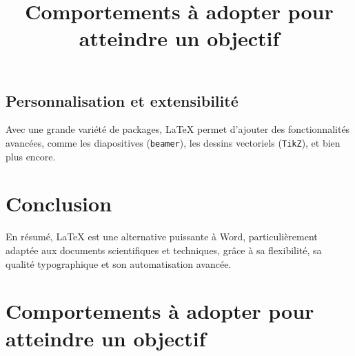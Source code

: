 \documentclass[a4paper,12pt]{article} %
\begin{document}
\subsection{Personnalisation et extensibilité}
Avec une grande variété de packages, \LaTeX{} permet d’ajouter des fonctionnalités avancées, 
comme les diapositives (\texttt{beamer}), les dessins vectoriels (\texttt{TikZ}), et bien plus encore.

\section{Conclusion} %
En résumé, \LaTeX{} est une alternative puissante à Word, 
particulièrement adaptée aux documents scientifiques et techniques, 
grâce à sa flexibilité, sa qualité typographique et son automatisation avancée.



\title{Comportements à adopter pour atteindre un objectif}  %
\maketitle  %

\section{Comportements à adopter pour atteindre un objectif}
\end{document}
